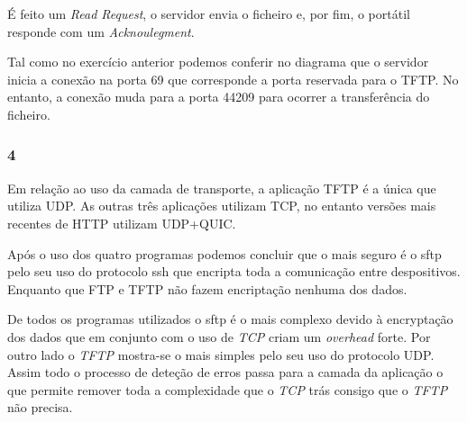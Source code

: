 \documentclass{article}
\begin{document}
                    É feito um \textit{Read Request}, o servidor envia o ficheiro e, por fim, o portátil responde com um \textit{Acknoulegment}.

                    Tal como no exercício anterior podemos conferir no diagrama que o servidor inicia a conexão na porta 69 que corresponde a porta reservada para o TFTP. No entanto, a conexão muda para a porta 44209 para ocorrer a transferência do ficheiro.
            \clearpage
            \subsubsection*{4}
		            Em relação ao uso da camada de transporte, a aplicação TFTP é a única que utiliza UDP. As outras três aplicações utilizam TCP, no entanto versões mais recentes de HTTP utilizam UDP+QUIC.

                    Após o uso dos quatro programas podemos concluir que o mais seguro é o sftp pelo seu uso do protocolo ssh que encripta toda a comunicação entre despositivos. Enquanto que FTP e TFTP não fazem encriptação nenhuma dos dados.

                    De todos os programas utilizados o sftp é o mais complexo devido à encryptação dos dados que em conjunto com o uso de \textit{TCP} criam um \textit{overhead} forte. Por outro lado o \textit{TFTP} mostra-se o mais simples 
                pelo seu uso do protocolo UDP. Assim todo o processo de deteção de erros passa para a camada da aplicação o que permite remover toda a complexidade que o \textit{TCP} trás consigo que o \textit{TFTP} não precisa.
\end{document}
